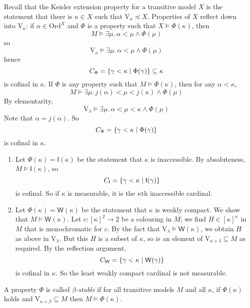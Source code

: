 Recall that the Keisler extension property for a transitive model \( X \) is the statement that there is \( \kappa \in X \) such that \( \mathrm{V}_\kappa \preceq X \).
Properties of \( X \) reflect down into \( \mathrm{V}_\kappa \): if \( \alpha \in \mathrm{Ord}^X \) and \( \Phi \) is a property such that \( X \vDash \Phi(\kappa) \), then
\[ M \vDash \exists \mu.\, \alpha < \mu \wedge \Phi(\mu) \]
so
\[ \mathrm{V}_\kappa \vDash \exists \mu.\, \alpha < \mu \wedge \Phi(\mu) \]
hence
\[ C_\Phi = \qty{\gamma < \kappa \mid \Phi(\gamma)} \subseteq \kappa \]
is cofinal in \( \kappa \).
If \( \Phi \) is any property such that \( M \vDash \Phi(\kappa) \), then for any \( \alpha < \kappa \),
\[ M \vDash \exists \mu.\, j(\alpha) < \mu < j(\kappa) \wedge \Phi(\mu) \]
By elementarity,
\[ \mathrm{V}_\lambda \vDash \exists \mu.\, \alpha < \mu < \kappa \wedge \Phi(\mu) \]
Note that \( \alpha = j(\alpha) \).
So
\[ C_\Phi = \qty{\gamma < \kappa \mid \Phi(\gamma)} \]
is cofinal in \( \kappa \).
\begin{example}
    \begin{enumerate}
        \item Let \( \Phi(\kappa) = \mathsf{I}(\kappa) \) be the statement that \( \kappa \) is inaccessible.
        By absoluteness, \( M \vDash \mathsf{I}(\kappa) \), so
        \[ C_{\mathsf{I}} = \qty{\gamma < \kappa \mid \mathsf{I}(\gamma)} \]
        is cofinal.
        So if \( \kappa \) is measurable, it is the \( \kappa \)th inaccessible cardinal.
        \item Let \( \Phi(\kappa) = \mathsf{W}(\kappa) \) be the statement that \( \kappa \) is weakly compact.
        We show that \( M \vDash \mathsf{W}(\kappa) \).
        Let \( c : [\kappa]^2 \to 2 \) be a colouring in \( M \); we find \( H \in [\kappa]^\kappa \) in \( M \) that is monochromatic for \( c \).
        By the fact that \( \mathrm{V}_\lambda \vDash \mathsf{W}(\kappa) \), we obtain \( H \) as above in \( \mathrm{V}_\lambda \).
        But this \( H \) is a subset of \( \kappa \), so is an element of \( \mathrm{V}_{\kappa + 1} \subseteq M \) as required.
        By the reflection argument,
        \[ C_{\mathsf{W}} = \qty{\gamma < \kappa \mid \mathsf{W}(\gamma)} \]
        is cofinal in \( \kappa \).
        So the least weakly compact cardinal is not measurable.
    \end{enumerate}
\end{example}
\begin{definition}
    A property \( \Phi \) is called \emph{\( \beta \)-stable} if for all transitive models \( M \) and all \( \kappa \), if \( \Phi(\kappa) \) holds and \( \mathrm{V}_{\kappa + \beta} \subseteq M \) then \( M \vDash \Phi(\kappa) \).
\end{definition}
